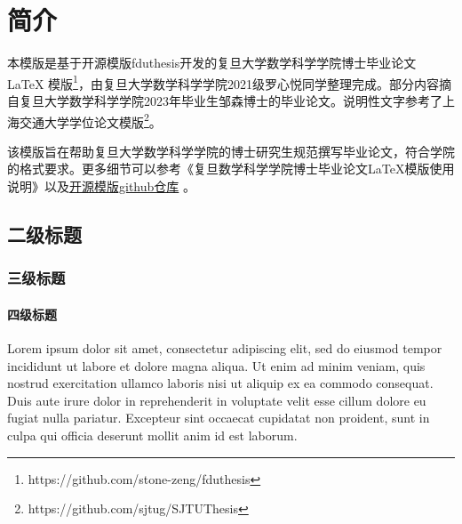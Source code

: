 \chapter{简介}
本模版是基于开源模版fduthesis开发的复旦大学数学科学学院博士毕业论文 LaTeX 模版\footnote{https://github.com/stone-zeng/fduthesis}，由复旦大学数学科学学院2021级罗心悦同学整理完成。部分内容摘自复旦大学数学科学学院2023年毕业生邹森博士的毕业论文。说明性文字参考了上海交通大学学位论文模版\footnote{https://github.com/sjtug/SJTUThesis}。 

该模版旨在帮助复旦大学数学科学学院的博士研究生规范撰写毕业论文，符合学院的格式要求。更多细节可以参考《复旦数学科学学院博士毕业论文\LaTeX{}模版使用说明》以及\href{https://github.com/stone-zeng/fduthesis}{开源模版github仓库} 。

\section{二级标题}

\subsection{三级标题}

\subsubsection{四级标题}

Lorem ipsum dolor sit amet, consectetur adipiscing elit, sed do eiusmod tempor
incididunt ut labore et dolore magna aliqua. Ut enim ad minim veniam, quis
nostrud exercitation ullamco laboris nisi ut aliquip ex ea commodo consequat.
Duis aute irure dolor in reprehenderit in voluptate velit esse cillum dolore eu
fugiat nulla pariatur. Excepteur sint occaecat cupidatat non proident, sunt in
culpa qui officia deserunt mollit anim id est laborum.

